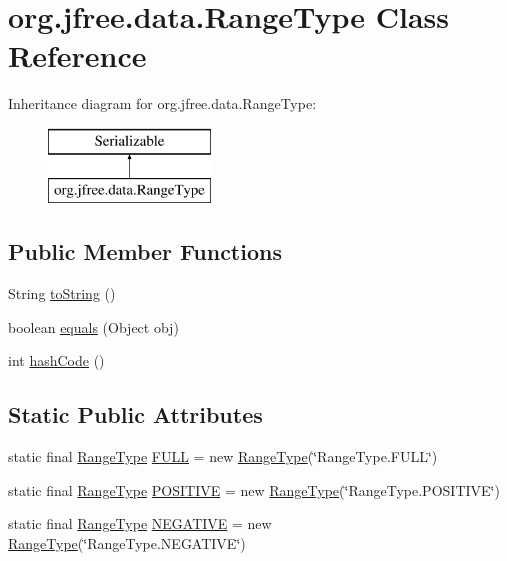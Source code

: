 \hypertarget{classorg_1_1jfree_1_1data_1_1_range_type}{}\section{org.\+jfree.\+data.\+Range\+Type Class Reference}
\label{classorg_1_1jfree_1_1data_1_1_range_type}
Inheritance diagram for org.\+jfree.\+data.\+Range\+Type\+:\begin{figure}[H]
\begin{center}
\leavevmode
\includegraphics[height=2.000000cm]{classorg_1_1jfree_1_1data_1_1_range_type}
\end{center}
\end{figure}
\subsection*{Public Member Functions}
\begin{DoxyCompactItemize}
\item 
String \mbox{\hyperlink{classorg_1_1jfree_1_1data_1_1_range_type_a31fb26ff2088e3b093d858e4e246bd03}{to\+String}} ()
\item 
boolean \mbox{\hyperlink{classorg_1_1jfree_1_1data_1_1_range_type_aa08e4da7f9c39afa72ae2e048c26c8fd}{equals}} (Object obj)
\item 
int \mbox{\hyperlink{classorg_1_1jfree_1_1data_1_1_range_type_a373313649f878f977e7206472d4d3de0}{hash\+Code}} ()
\end{DoxyCompactItemize}
\subsection*{Static Public Attributes}
\begin{DoxyCompactItemize}
\item 
static final \mbox{\hyperlink{classorg_1_1jfree_1_1data_1_1_range_type}{Range\+Type}} \mbox{\hyperlink{classorg_1_1jfree_1_1data_1_1_range_type_a3e302ea8106ef09ff670c87da76b8717}{F\+U\+LL}} = new \mbox{\hyperlink{classorg_1_1jfree_1_1data_1_1_range_type}{Range\+Type}}(\char`\"{}Range\+Type.\+F\+U\+LL\char`\"{})
\item 
static final \mbox{\hyperlink{classorg_1_1jfree_1_1data_1_1_range_type}{Range\+Type}} \mbox{\hyperlink{classorg_1_1jfree_1_1data_1_1_range_type_a155e925e59fa5fbdd37bb83bdd7cb08c}{P\+O\+S\+I\+T\+I\+VE}} = new \mbox{\hyperlink{classorg_1_1jfree_1_1data_1_1_range_type}{Range\+Type}}(\char`\"{}Range\+Type.\+P\+O\+S\+I\+T\+I\+VE\char`\"{})
\item 
static final \mbox{\hyperlink{classorg_1_1jfree_1_1data_1_1_range_type}{Range\+Type}} \mbox{\hyperlink{classorg_1_1jfree_1_1data_1_1_range_type_a904104507ac7c9c386598803083763fe}{N\+E\+G\+A\+T\+I\+VE}} = new \mbox{\hyperlink{classorg_1_1jfree_1_1data_1_1_range_type}{Range\+Type}}(\char`\"{}Range\+Type.\+N\+E\+G\+A\+T\+I\+VE\char`\"{})
\end{DoxyCompactItemize}


